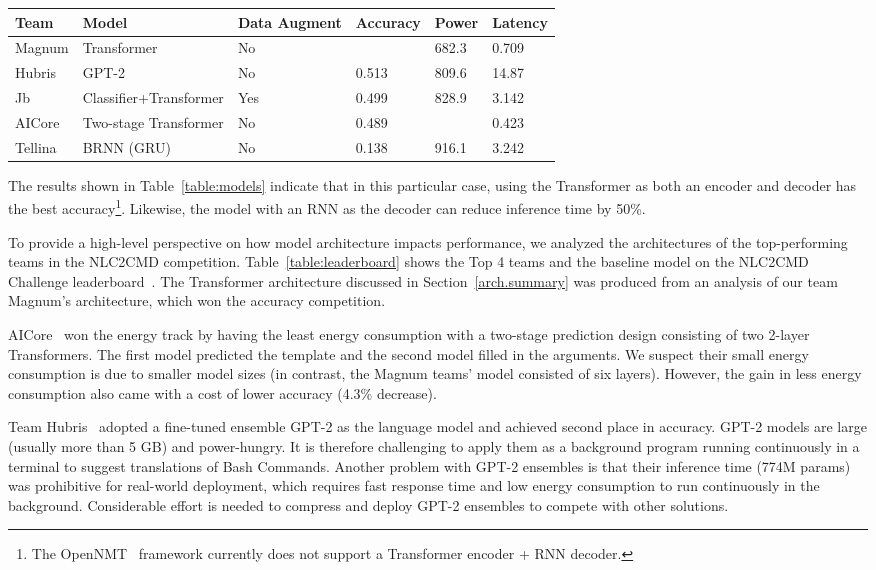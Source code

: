 \documentclass{river-journal}
\begin{document}
\begin{table*}[bhtp]
\caption{\label{table:leaderboard} The NLC2CMD Leaderboard}
\centering
\begin{tabular}{llllll}
\hline \textbf{Team} & \textbf{Model} & \textbf{Data Augment}& \textbf{Accuracy} & \textbf{Power} & \textbf{Latency}
\\\hline
Magnum & Transformer & No &  & 682.3 & 0.709 \\
Hubris & GPT-2 & No & 0.513 & 809.6 & 14.87 \\
Jb & Classifier+Transformer & Yes & 0.499 & 828.9 & 3.142 \\
AICore & Two-stage Transformer & No & 0.489 &  & 0.423 \\
Tellina~\cite{Lin2017ProgramSF} & BRNN (GRU) & No & 0.138 & 916.1 & 3.242 \\
\hline
\end{tabular}
\end{table*}

The results shown in Table~\ref{table:models} indicate that in this particular case, using the Transformer as both an encoder and decoder has the best accuracy\footnote{The OpenNMT~\cite{Klein2017OpenNMTOT} framework currently does not support a Transformer encoder + RNN decoder.}. Likewise, the model with an RNN as the decoder can reduce inference time by 50\%.

To provide a high-level perspective on how model architecture impacts performance, we analyzed the architectures of the top-performing teams in the NLC2CMD competition. Table~\ref{table:leaderboard} shows the Top 4 teams and the baseline model on the NLC2CMD Challenge leaderboard~\cite{Agarwal2021NeurIPS2N}. The Transformer architecture discussed in Section~\ref{arch.summary} was produced from an analysis of our team Magnum's architecture, which won the accuracy competition. 

AICore~\cite{Agarwal2021NeurIPS2N} won the energy track by having the least energy consumption with a two-stage prediction design consisting of two 2-layer Transformers. The first model predicted the template and the second model filled in the arguments. We suspect their small energy consumption is due to smaller model sizes (in contrast, the Magnum teams' model consisted of six layers). However, the gain in less energy consumption also came with a cost of lower accuracy (4.3\% decrease). 

Team Hubris~\cite{Agarwal2021NeurIPS2N} adopted a fine-tuned ensemble GPT-2 as the language model and achieved second place in accuracy. GPT-2 models are large (usually more than 5 GB) and power-hungry. It is therefore challenging to apply them as a background program running continuously in a terminal to suggest translations of Bash Commands. Another problem with GPT-2 ensembles is that their inference time (774M params) was prohibitive for real-world deployment, which requires fast response time and low energy consumption to run continuously in the background. Considerable effort is needed to compress and deploy GPT-2 ensembles to compete with other solutions.
\end{document}

